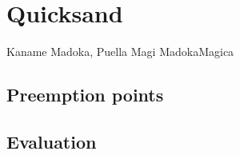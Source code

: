 \chapter{Quicksand}
\label{chap:quicksand}
{Kaname Madoka, Puella Magi Madoka{\raisebox{0.1em}{$\scriptstyle \bigstar$}}Magica}


\section{Preemption points} %
\label{sec:quicksand-pps}

\section{Evaluation}
\label{sec:quicksand-eval}

